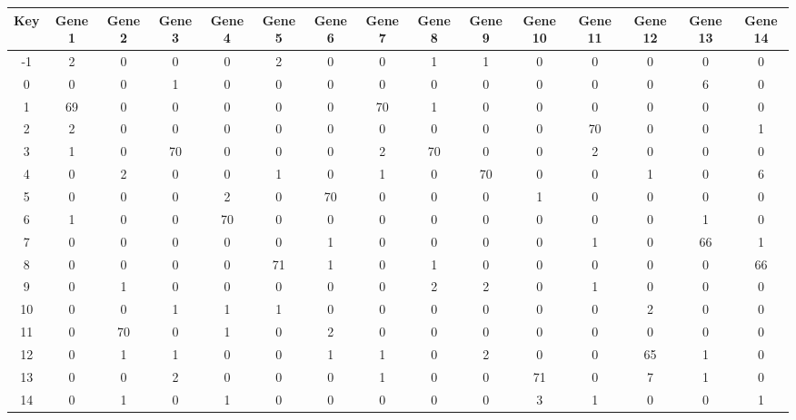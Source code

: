 \begin{tabular}{|c|c|c|c|c|c|c|c|c|c|c|c|c|c|c|}
\hline
Key & Gene 1 & Gene 2 & Gene 3 & Gene 4 & Gene 5 & Gene 6 & Gene 7 & Gene 8 & Gene 9 & Gene 10 & Gene 11 & Gene 12 & Gene 13 & Gene 14 \\
\hline
-1 & 2 & 0 & 0 & 0 & 2 & 0 & 0 & 1 & 1 & 0 & 0 & 0 & 0 & 0 \\
0 & 0 & 0 & 1 & 0 & 0 & 0 & 0 & 0 & 0 & 0 & 0 & 0 & 6 & 0 \\
1 & 69 & 0 & 0 & 0 & 0 & 0 & 70 & 1 & 0 & 0 & 0 & 0 & 0 & 0 \\
2 & 2 & 0 & 0 & 0 & 0 & 0 & 0 & 0 & 0 & 0 & 70 & 0 & 0 & 1 \\
3 & 1 & 0 & 70 & 0 & 0 & 0 & 2 & 70 & 0 & 0 & 2 & 0 & 0 & 0 \\
4 & 0 & 2 & 0 & 0 & 1 & 0 & 1 & 0 & 70 & 0 & 0 & 1 & 0 & 6 \\
5 & 0 & 0 & 0 & 2 & 0 & 70 & 0 & 0 & 0 & 1 & 0 & 0 & 0 & 0 \\
6 & 1 & 0 & 0 & 70 & 0 & 0 & 0 & 0 & 0 & 0 & 0 & 0 & 1 & 0 \\
7 & 0 & 0 & 0 & 0 & 0 & 1 & 0 & 0 & 0 & 0 & 1 & 0 & 66 & 1 \\
8 & 0 & 0 & 0 & 0 & 71 & 1 & 0 & 1 & 0 & 0 & 0 & 0 & 0 & 66 \\
9 & 0 & 1 & 0 & 0 & 0 & 0 & 0 & 2 & 2 & 0 & 1 & 0 & 0 & 0 \\
10 & 0 & 0 & 1 & 1 & 1 & 0 & 0 & 0 & 0 & 0 & 0 & 2 & 0 & 0 \\
11 & 0 & 70 & 0 & 1 & 0 & 2 & 0 & 0 & 0 & 0 & 0 & 0 & 0 & 0 \\
12 & 0 & 1 & 1 & 0 & 0 & 1 & 1 & 0 & 2 & 0 & 0 & 65 & 1 & 0 \\
13 & 0 & 0 & 2 & 0 & 0 & 0 & 1 & 0 & 0 & 71 & 0 & 7 & 1 & 0 \\
14 & 0 & 1 & 0 & 1 & 0 & 0 & 0 & 0 & 0 & 3 & 1 & 0 & 0 & 1 \\
\hline
\end{tabular}